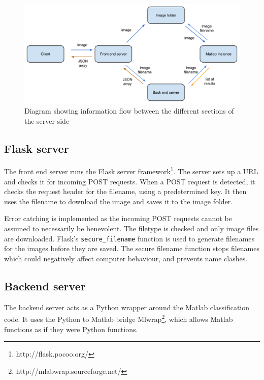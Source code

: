 \documentclass[11pt, a4paper]{report}
\begin{document}
\begin{figure}[hbt]
	\centering
  \includegraphics[totalheight=8cm]{img/07.png}
  \caption{Diagram showing information flow between the different sections of the server side}
  \label{img:07.png}
\end{figure}

\subsection{Flask server}

The front end server runs the Flask server framework\footnote{http://flask.pocoo.org/}. The server sets up a URL and checks it for incoming POST requests. When a POST request is detected, it checks the request header for the filename, using a predetermined key. It then uses the filename to download the image and saves it to the image folder. 

Error catching is implemented as the incoming POST requests cannot be assumed to necessarily be benevolent. The filetype is checked and only image files are downloaded. Flask's \verb|secure_filename| function is used to generate filenames for the images before they are saved. The secure filename function stops filenames which could negatively affect computer behaviour, and prevents name clashes.


\subsection{Backend server}

The backend server acts as a Python wrapper around the Matlab classification code. It uses the Python to Matlab bridge Mlwrap\footnote{http://mlabwrap.sourceforge.net/}, which allows Matlab functions as if they were Python functions. 
\end{document}
